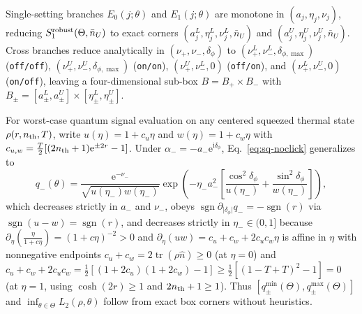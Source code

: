 \documentclass{iopjournal}
\newcommand{\tr}{\operatorname{tr}}
\newcommand{\sgn}{\operatorname{sgn}}
\newcommand{\nU}{\bar n_U}
\newcommand{\abs}[1]{\lvert #1\rvert}
\newcommand{\ii}{\mathrm{i}}
\newcommand{\ee}{\mathrm{e}}
\begin{document}
Single-setting branches $E_0(j;\theta)$ and $E_1(j;\theta)$ are monotone in $(a_j,\eta_j,\nu_j)$, reducing $S_1^{\rm robust}(\Theta,\nU)$ to exact corners $(a_j^L,\eta_j^L,\nu_j^L,\nU)$ and $(a_j^U,\eta_j^U,\nu_j^U,\nU)$. Cross branches reduce analytically in $(\nu_+,\nu_-,\delta_\phi)$ to $(\nu_+^L,\nu_-^L,\delta_{\phi,\max})$ (\texttt{off/off}), $(\nu_+^U,\nu_-^U,\delta_{\phi,\max})$ (\texttt{on/on}), $(\nu_+^U,\nu_-^L,0)$ (\texttt{off/on}), and $(\nu_+^L,\nu_-^U,0)$ (\texttt{on/off}), leaving a four-dimensional sub-box $B = B_+ \times B_-$ with $B_\pm = [a_\pm^L,a_\pm^U]\times[\eta_\pm^L,\eta_\pm^U]$.

For worst-case quantum signal evaluation on any centered squeezed thermal state $\rho(r,n_{\rm th},T)$, write $u(\eta)=1+c_u\eta$ and $w(\eta)=1+c_w\eta$ with $c_{u,w} = \frac{T}{2}[(2n_{\rm th}+1)\ee^{\pm 2r}-1]$. Under $\alpha_- = -a_-\ee^{\ii\delta_\phi}$, Eq.~\eqref{eq:sq-noclick} generalizes to
\begin{equation*}
q_-(\theta) = \frac{\ee^{-\nu_-}}{\sqrt{u(\eta_-)w(\eta_-)}}\exp\!\left(-\eta_- a_-^2\!\left[\frac{\cos^2\delta_\phi}{u(\eta_-)} + \frac{\sin^2\delta_\phi}{w(\eta_-)}\right]\right),
\end{equation*}
which decreases strictly in $a_-$ and $\nu_-$, obeys $\sgn\partial_{\abs{\delta_\phi}}q_- = -\sgn(r)$ via $\sgn(u-w)=\sgn(r)$, and decreases strictly in $\eta_-\in(0,1]$ because $\partial_\eta(\frac{\eta}{1+c\eta}) = (1+c\eta)^{-2} > 0$ and $\partial_\eta(uw) = c_u+c_w+2c_uc_w\eta$ is affine in $\eta$ with nonnegative endpoints $c_u+c_w = 2\tr(\rho\hat n)\ge 0$ (at $\eta=0$) and $c_u+c_w+2c_uc_w = \frac{1}{2}[(1+2c_u)(1+2c_w)-1] \ge \frac{1}{2}[(1-T+T)^2-1] = 0$ (at $\eta=1$, using $\cosh(2r)\ge 1$ and $2n_{\rm th}+1\ge 1$). Thus $[q_\pm^{\min}(\Theta), q_\pm^{\max}(\Theta)]$ and $\inf_{\theta\in\Theta} L_2(\rho,\theta)$ follow from exact box corners without heuristics.
\end{document}
